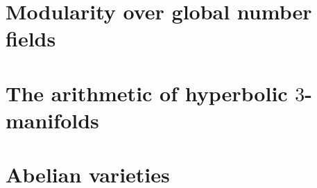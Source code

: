             
            
        \chapter{Modularity over global number fields}
            \begin{abstract}
                
            \end{abstract}
            
            \minitoc
            
        \begin{appendices}
            \chapter{The arithmetic of hyperbolic \texorpdfstring{$3$}{}-manifolds}
                \begin{abstract}
                    
                \end{abstract}
                
                \minitoc
                
                
                
                
                
                
                
                
                
            \chapter{Abelian varieties}
                \begin{abstract}
                    
                \end{abstract}
                
                \minitoc
                
                
                

\end{appendices}
